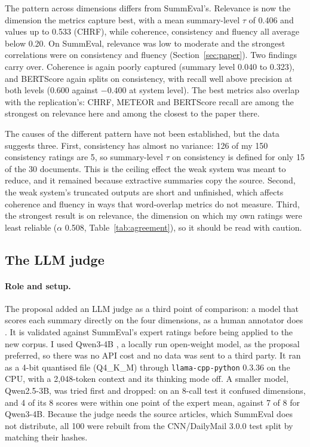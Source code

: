 \documentclass[11pt]{article}
\begin{document}
The pattern across dimensions differs from SummEval's. Relevance is now the dimension the metrics capture best, with a mean summary-level $\tau$ of 0.406 and values up to 0.533 (CHRF), while coherence, consistency and fluency all average below 0.20. On SummEval, relevance was low to moderate and the strongest correlations were on consistency and fluency (Section~\ref{sec:paper}). Two findings carry over. Coherence is again poorly captured (summary level 0.040 to 0.323), and BERTScore again splits on consistency, with recall well above precision at both levels (0.600 against $-0.400$ at system level). The best metrics also overlap with the replication's: CHRF, METEOR and BERTScore recall are among the strongest on relevance here and among the closest to the paper there.

The causes of the different pattern have not been established, but the data suggests three. First, consistency has almost no variance: 126 of my 150 consistency ratings are 5, so summary-level $\tau$ on consistency is defined for only 15 of the 30 documents. This is the ceiling effect the weak system was meant to reduce, and it remained because extractive summaries copy the source. Second, the weak system's truncated outputs are short and unfinished, which affects coherence and fluency in ways that word-overlap metrics do not measure. Third, the strongest result is on relevance, the dimension on which my own ratings were least reliable ($\alpha$ 0.508, Table~\ref{tab:agreement}), so it should be read with caution.

\subsection{The LLM judge}
\label{sec:res-judge}

\paragraph{Role and setup.}
The proposal added an LLM judge as a third point of comparison: a model that scores each summary directly on the four dimensions, as a human annotator does \citep{liu-etal-2023-geval}. It is validated against SummEval's expert ratings before being applied to the new corpus. I used Qwen3-4B \citep{yang-etal-2025-qwen3}, a locally run open-weight model, as the proposal preferred, so there was no API cost and no data was sent to a third party. It ran as a 4-bit quantised file (Q4\_K\_M) through \texttt{llama-cpp-python} 0.3.36 on the CPU, with a 2,048-token context and its thinking mode off. A smaller model, Qwen2.5-3B, was tried first and dropped: on an 8-call test it confused dimensions, and 4 of its 8 scores were within one point of the expert mean, against 7 of 8 for Qwen3-4B. Because the judge needs the source articles, which SummEval does not distribute, all 100 were rebuilt from the CNN/DailyMail 3.0.0 test split by matching their hashes.
\end{document}
